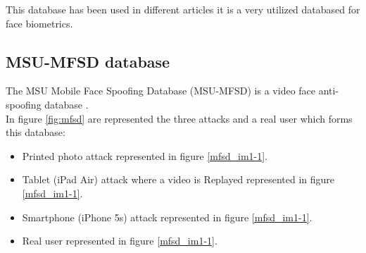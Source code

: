 

This database has been used in different articles \cite{yangLL14,Spoofing_survey,MSUdatabse,LSTM-CNN} it is a very utilized databased for face biometrics.\\

\subsection{MSU-MFSD database}
The MSU Mobile Face Spoofing Database (MSU-MFSD) is a video face anti-spoofing database \cite{MSUdatabse}.\\

In figure \ref{fig:mfsd} are represented the three attacks and a real user which forms this database:
\begin{itemize}[itemsep=2pt,topsep=8pt,parsep=0pt,partopsep=20pt]
\item Printed photo attack represented in figure \ref{mfsd_im1-1}.
\item Tablet (iPad Air) attack where a video is Replayed represented in figure \ref{mfsd_im1-1}.
\item Smartphone (iPhone 5s) attack represented in figure \ref{mfsd_im1-1}.
\item Real user represented in figure \ref{mfsd_im1-1}.
\end{itemize}

